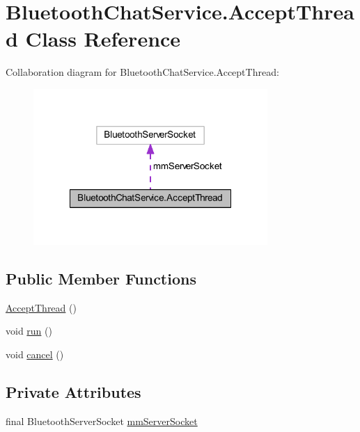 \hypertarget{classcom_1_1example_1_1android_1_1_bluetooth_chat_1_1_bluetooth_chat_service_1_1_accept_thread}{\section{Bluetooth\-Chat\-Service.\-Accept\-Thread Class Reference}
\label{classcom_1_1example_1_1android_1_1_bluetooth_chat_1_1_bluetooth_chat_service_1_1_accept_thread}
}


Collaboration diagram for Bluetooth\-Chat\-Service.\-Accept\-Thread\-:\nopagebreak
\begin{figure}[H]
\begin{center}
\leavevmode
\includegraphics[width=252pt]{classcom_1_1example_1_1android_1_1_bluetooth_chat_1_1_bluetooth_chat_service_1_1_accept_thread__coll__graph}
\end{center}
\end{figure}
\subsection*{Public Member Functions}
\begin{DoxyCompactItemize}
\item 
\hyperlink{classcom_1_1example_1_1android_1_1_bluetooth_chat_1_1_bluetooth_chat_service_1_1_accept_thread_a87e04948833d0fd4826daa3f527b2153}{Accept\-Thread} ()
\item 
void \hyperlink{classcom_1_1example_1_1android_1_1_bluetooth_chat_1_1_bluetooth_chat_service_1_1_accept_thread_a13a43e6d814de94978c515cb084873b1}{run} ()
\item 
void \hyperlink{classcom_1_1example_1_1android_1_1_bluetooth_chat_1_1_bluetooth_chat_service_1_1_accept_thread_a02d5fa6b14e221f3012a794b905be166}{cancel} ()
\end{DoxyCompactItemize}
\subsection*{Private Attributes}
\begin{DoxyCompactItemize}
\item 
final Bluetooth\-Server\-Socket \hyperlink{classcom_1_1example_1_1android_1_1_bluetooth_chat_1_1_bluetooth_chat_service_1_1_accept_thread_a0b04e3279c0cd8ff1bc19ab19c7539d9}{mm\-Server\-Socket}
\end{DoxyCompactItemize}


